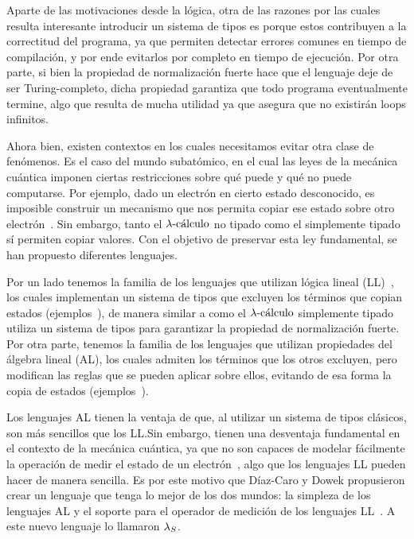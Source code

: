 Aparte de las motivaciones desde la lógica, otra de las razones por las cuales resulta interesante introducir un sistema de tipos es porque estos contribuyen a la correctitud del programa, ya que permiten detectar errores comunes en tiempo de compilación, y por ende evitarlos por completo en tiempo de ejecución. Por otra parte, si bien la propiedad de normalización fuerte hace que el lenguaje deje de ser Turing-completo, dicha propiedad garantiza que todo programa eventualmente termine, algo que resulta de mucha utilidad ya que asegura que no existirán loops infinitos.

Ahora bien, existen contextos en los cuales necesitamos evitar otra clase de fenómenos. Es el caso del mundo subatómico, en el cual las leyes de la mecánica cuántica imponen ciertas restricciones sobre qué puede y qué no puede computarse. Por ejemplo, dado un electrón en cierto estado desconocido, es imposible construir un mecanismo que nos permita copiar ese estado sobre otro electrón~\cite{wootters, dieks}. Sin embargo, tanto el \( \lambdacalculus \) no tipado como el simplemente tipado sí permiten copiar valores. Con el objetivo de preservar esta ley fundamental, se han propuesto diferentes lenguajes.

Por un lado tenemos la familia de los lenguajes que utilizan lógica lineal (LL)~\cite{abramsky}, los cuales implementan un sistema de tipos que excluyen los términos que copian estados (ejemplos~\cite{altenkirch, selinger, zorzi}), de manera similar a como el \( \lambdacalculus \) simplemente tipado utiliza un sistema de tipos para garantizar la propiedad de normalización fuerte. Por otra parte, tenemos la familia de los lenguajes que utilizan propiedades del álgebra lineal (AL), los cuales admiten los términos que los otros excluyen, pero modifican las reglas que se pueden aplicar sobre ellos, evitando de esa forma la copia de estados (ejemplos~\cite{arrighi, arrighi2, arrighi3, arrighi4, assaf}).

Los lenguajes AL tienen la ventaja de que, al utilizar un sistema de tipos clásicos, son más sencillos que los LL.\@ Sin embargo, tienen una desventaja fundamental en el contexto de la mecánica cuántica, ya que no son capaces de modelar fácilmente la operación de medir el estado de un electrón~\cite{valiron}, algo que los lenguajes LL pueden hacer de manera sencilla. Es por este motivo que Díaz-Caro y Dowek propusieron crear un lenguaje que tenga lo mejor de los dos mundos: la simpleza de los lenguajes AL y el soporte para el operador de medición de los lenguajes LL~\cite{qmeas}. A este nuevo lenguaje lo llamaron \( \lambdas \).

